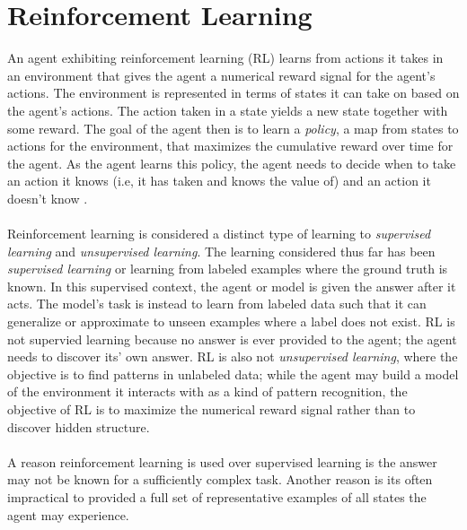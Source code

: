 \section{Reinforcement Learning}
An agent exhibiting reinforcement learning (RL) learns from actions it takes in an 
environment that gives the agent a numerical reward signal for the agent's actions. 
The environment is represented in terms of states it can take on based on the agent's 
actions. 
The action taken in a state yields a new state together with some reward.
The goal of the agent then is to learn a \textit{policy}, a map from states to actions
for the environment, that maximizes the cumulative reward over time for the agent.
As the agent learns this policy, the agent needs to decide when to take an action it 
knows (i.e, it has taken and knows the value of) and an action it doesn't know \cite{SutBar:18}.
\\\\
Reinforcement learning is considered a distinct type of learning to \textit{supervised
learning} and \textit{unsupervised learning}. The learning considered thus far has been 
\textit{supervised learning} or learning from labeled examples where the ground truth is known. 
In this supervised context, the agent or model is given the answer after it acts. The 
model's task is instead to learn from labeled data such that it can generalize
or approximate to unseen examples where a label does not exist. 
RL is not supervied learning because no answer is ever provided to the agent; the agent
needs to discover its' own answer. 
RL is also not \textit{unsupervised learning}, where the objective is to find patterns in 
unlabeled data; while the agent may build a model of the environment it interacts with as
a kind of pattern recognition, the objective of RL is to maximize the numerical reward
signal rather than to discover hidden structure.
\\\\
A reason reinforcement learning is used over supervised learning is the answer may not 
be known for a sufficiently complex task. Another reason is its often impractical to 
provided a full set of representative examples of all states the agent may experience.
